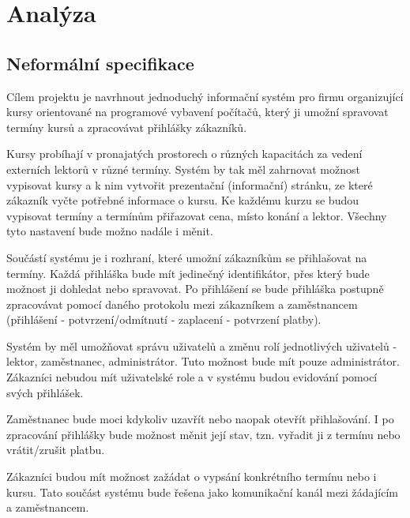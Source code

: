 \documentclass[12pt,a4paper,titlepage,final]{report}
\begin{document}
	\def\authora{Michal Riša}
	\def\authorb{Pavel Macenauer}
	\def\emaila{xrisam01@stud.fit.vutbr.cz}
	\def\emailb{xmacen02@stud.fit.vutbr.cz}
	\def\docname{Firma2}
	\def\projname{Prvotná analýza a plán projektu}
	
	\newpage
	\pagestyle{plain}
	\setcounter{page}{1}
	\setcounter{secnumdepth}{-1}
	\setlength{\parindent}{1cm}	
	


	\chapter{Analýza}
	
	\section{Neformální specifikace}
	Cílem projektu je navrhnout jednoduchý informační systém pro firmu organizující kursy orientované na programové vybavení počítačů, který ji umožní spravovat termíny kursů a zpracovávat přihlášky zákazníků.
	
	Kursy probíhají v pronajatých prostorech o různých kapacitách za vedení externích lektorů v různé termíny. Systém by tak měl zahrnovat možnost vypisovat kursy a k nim vytvořit prezentační (informační) stránku, ze které zákazník vyčte potřebné informace o kursu. Ke každému kurzu se budou vypisovat termíny a termínům přiřazovat cena, místo konání a lektor. Všechny tyto nastavení bude možno nadále i měnit.
	
	Součástí systému je i rozhraní, které umožní zákazníkům se přihlašovat na termíny. Každá přihláška bude mít jedinečný identifikátor, přes který bude možnost ji dohledat nebo spravovat. Po přihlášení se bude přihláška postupně zpracovávat pomocí daného protokolu mezi zákazníkem a zaměstnancem (přihlášení - potvrzení/odmítnutí - zaplacení - potvrzení platby).
	
	Systém by měl umožňovat správu uživatelů a změnu rolí jednotlivých uživatelů - lektor, zaměstnanec, administrátor. Tuto možnost bude mít pouze administrátor. Zákazníci nebudou mít uživatelské role a v systému budou evidování pomocí svých přihlášek.
	
	Zaměstnanec bude moci kdykoliv uzavřít nebo naopak otevřít přihlašování. I po zpracování přihlášky bude možnost měnit její stav, tzn. vyřadit ji z termínu nebo vrátit/zrušit platbu.
	
	Zákazníci budou mít možnost zažádat o vypsání konkrétního termínu nebo i kursu. Tato součást systému bude řešena jako komunikační kanál mezi žádajícím a zaměstnancem.
	
\end{document}
